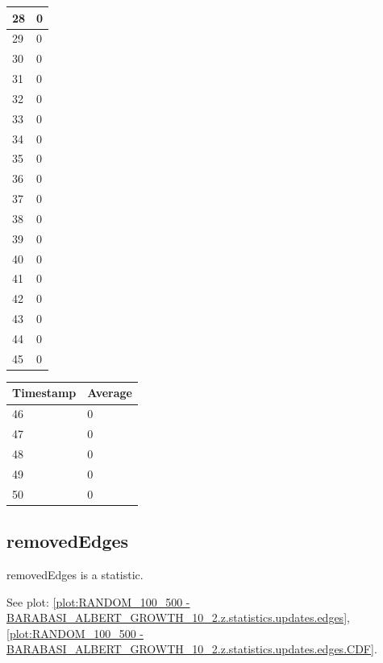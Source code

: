 \begin{tabular}{|l||l|}
	28 & 0 \\ \hline
	29 & 0 \\ \hline
	30 & 0 \\ \hline
	31 & 0 \\ \hline
	32 & 0 \\ \hline
	33 & 0 \\ \hline
	34 & 0 \\ \hline
	35 & 0 \\ \hline
	36 & 0 \\ \hline
	37 & 0 \\ \hline
	38 & 0 \\ \hline
	39 & 0 \\ \hline
	40 & 0 \\ \hline
	41 & 0 \\ \hline
	42 & 0 \\ \hline
	43 & 0 \\ \hline
	44 & 0 \\ \hline
	45 & 0 \\ \hline
\end{tabular}
\begin{tabular}{|l||l|}
\hline
	\textbf{Timestamp} & \textbf{Average} \\ \hline
	46 & 0 \\ \hline
	47 & 0 \\ \hline
	48 & 0 \\ \hline
	49 & 0 \\ \hline
	50 & 0 \\ \hline
\end{tabular}

\subsection{removedEdges}
removedEdges is a statistic.

See plot: \ref{plot:RANDOM_100_500 - BARABASI_ALBERT_GROWTH_10_2.z.statistics.updates.edges}, \ref{plot:RANDOM_100_500 - BARABASI_ALBERT_GROWTH_10_2.z.statistics.updates.edges.CDF}.

